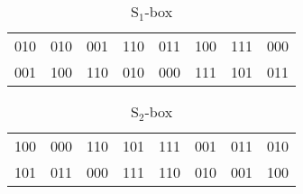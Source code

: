 \documentclass[11pt, a4paper, oneside]{Thesis} %
\begin{document}
    \begin{table}[ht] 
      \caption{S$_1$-box} %
      \centering %
      \begin{tabular}{c c c c c c c c} %
      \hline %
      010 & 010 & 001 & 110 & 011 & 100 & 111 & 000\\
      001 & 100 & 110 & 010 & 000 & 111 & 101 & 011\\
      \hline %
      \end{tabular} 
      \label{table:s1_example} %
    \end{table}

    \begin{table}[ht] 
      \caption{S$_2$-box} %
      \centering %
      \begin{tabular}{c c c c c c c c} %
      \hline %
      100 & 000 & 110 & 101 & 111 & 001 & 011 & 010\\
      101 & 011 & 000 & 111 & 110 & 010 & 001 & 100\\
      \hline %
      \end{tabular} 
      \label{table:s2_example} %
    \end{table}
\end{document}
